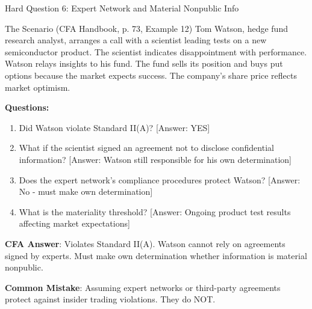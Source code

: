 \documentclass{beamer}
\begin{document}
	\begin{frame}{Hard Question 6: Expert Network and Material Nonpublic Info}
		\begin{block}{The Scenario (CFA Handbook, p. 73, Example 12)}
			Tom Watson, hedge fund research analyst, arranges a call with a scientist leading tests on a new semiconductor product. The scientist indicates disappointment with performance. Watson relays insights to his fund. The fund sells its position and buys put options because the market expects success. The company's share price reflects market optimism.
		\end{block}
		
		\vspace{0.2cm}
		\textbf{Questions:}
		\begin{enumerate}
			\item Did Watson violate Standard II(A)? \textcolor{cfared}{[Answer: YES]}
			\item What if the scientist signed an agreement not to disclose confidential information? \textcolor{cfared}{[Answer: Watson still responsible for his own determination]}
			\item Does the expert network's compliance procedures protect Watson? \textcolor{cfared}{[Answer: No - must make own determination]}
			\item What is the materiality threshold? \textcolor{cfared}{[Answer: Ongoing product test results affecting market expectations]}
		\end{enumerate}
		
		\vspace{0.2cm}
		\textcolor{cfablue}{\textbf{CFA Answer}}: Violates Standard II(A). Watson cannot rely on agreements signed by experts. Must make own determination whether information is material nonpublic.
		
		\vspace{0.1cm}
		\textcolor{cfared}{\textbf{Common Mistake}}: Assuming expert networks or third-party agreements protect against insider trading violations. They do NOT.
	\end{frame}
	
\end{document}
